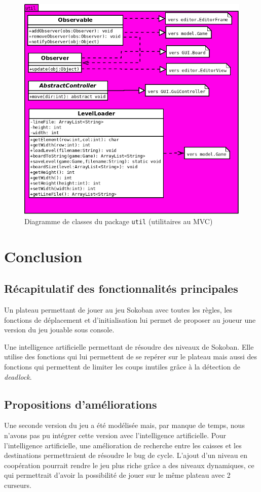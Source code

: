 \documentclass[a4paper, 11pt]{report}
\begin{document}
\begin{figure}[h!]
\centering
\includegraphics[width=.8\textwidth]{uml/util_uml.png}%
\caption{Diagramme de classes du package \texttt{util} (utilitaires au MVC)}
\label{uml:util_uml}
\end{figure}

\chapter{Conclusion}

\section{Récapitulatif des fonctionnalités principales}

Un plateau permettant de jouer au jeu Sokoban avec toutes les règles, les fonctions de déplacement et d'initialisation lui permet de proposer au joueur une version du jeu jouable sous console.

Une intelligence artificielle permettant de résoudre des niveaux de Sokoban. Elle utilise des fonctions qui lui permettent de se repérer sur le plateau mais aussi des fonctions qui permettent de limiter les coups inutiles grâce à la détection de \emph{deadlock}.

\section{Propositions d'améliorations}

Une seconde version du jeu a été modélisée mais, par manque de temps, nous n'avons pas pu intégrer cette version avec l'intelligence artificielle. Pour l'intelligence artificielle, une amélioration de recherche entre les caisses et les destinations permettraient de résoudre le bug de cycle. L'ajout d'un niveau en coopération pourrait rendre le jeu plus riche grâce a des niveaux dynamiques, ce qui permettrait d'avoir la possibilité de jouer sur le même plateau avec 2 curseurs.



\end{document}
